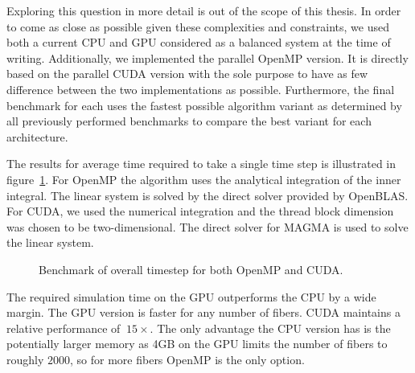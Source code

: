 \documentclass[a4paper,11pt]{kth-mag}
\begin{document}
Exploring this question in more detail is out of the scope of this thesis. In order to come as close as possible given these complexities and constraints, we used both a current CPU and GPU considered as a balanced system at the time of writing. Additionally, we implemented the parallel OpenMP version. It is directly based on the parallel CUDA version with the sole purpose to have as few difference between the two implementations as possible. Furthermore, the final benchmark for each uses the fastest possible algorithm variant as determined by all previously performed benchmarks to compare the best variant for each architecture.

The results for average time required to take a single time step is illustrated in figure~\ref{fig:overall}. For OpenMP the algorithm uses the analytical integration of the inner integral. The linear system is solved by the direct solver provided by OpenBLAS. For CUDA, we used the numerical integration and the thread block dimension was chosen to be two-dimensional. The direct solver for MAGMA is used to solve the linear system.

\begin{figure}[!htbp]
  \centering
  \caption{Benchmark of overall timestep for both OpenMP and CUDA.}
  \label{fig:overall}
\end{figure}

The required simulation time on the GPU outperforms the CPU by a wide margin. The GPU version is faster for any number of fibers. CUDA maintains a relative performance of $~15×$. The only advantage the CPU version has is the potentially larger memory as 4GB on the GPU limits the number of fibers to roughly $2000$, so for more fibers OpenMP is the only option.
\end{document}

